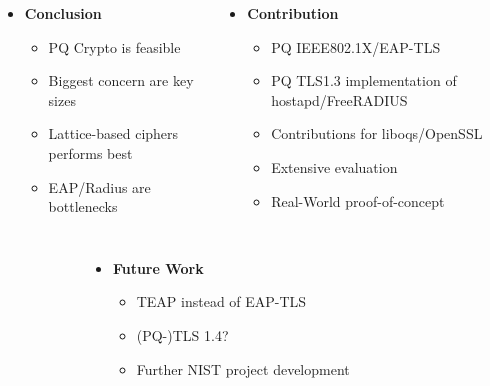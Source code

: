 \documentclass[fleqn,compress,utf8,aspectratio=169,t]{beamer}
\begin{document}
\begin{frame}{}
  \small
  \begin{columns}[T]
      \begin{itemize}
        \item[]<2-> \textbf{Conclusion}
        \begin{itemize}
          \scriptsize
          \item PQ Crypto is feasible
          \item Biggest concern are key sizes
          \item Lattice-based ciphers performs best
          \item EAP/Radius are bottlenecks
        \end{itemize}
      \end{itemize}
    \begin{itemize}
      \item[]<3-> \textbf{Contribution}
      \begin{itemize}
        \scriptsize
        \item PQ IEEE802.1X/EAP-TLS
        \item PQ TLS1.3 implementation of hostapd/FreeRADIUS
        \item Contributions for liboqs/OpenSSL
        \item Extensive evaluation
        \item Real-World proof-of-concept
      \end{itemize}
    \end{itemize}
    
    \end{columns}
    \begin{columns}[b]
      \begin{column}{0.3\textwidth}
      \end{column}
      \begin{column}{0.5\textwidth}
        \begin{center}
          \begin{itemize}
            \item[]<4-> \textbf{Future Work}
            \begin{itemize}
              \scriptsize
              \item TEAP instead of EAP-TLS
              \item (PQ-)TLS 1.4?
              \item Further NIST project development
            \end{itemize}
          \end{itemize}
      \end{center}
    \end{column}
    \begin{column}{0.2\textwidth}

    \end{column}
  \end{columns}
\end{frame}
\end{document}
